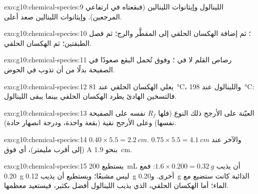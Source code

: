\begin{solution}{exo:g10:chemical-species:9}
اللينالول وإيثانوات اللينالين (فبقعتاه في ارتفاعي المرجعين). وإيثانوات
اللينالين صعد أعلى.
\end{solution}

\begin{solution}{exo:g10:chemical-species:10}
؛ ثم إضافة الهكسان الحلقي إلى المقطَّر والرج؛ ثم فصل الطبقتين؛
ثم  الهكسان الحلقي.
\end{solution}

\begin{solution}{exo:g10:chemical-species:11}
رصاص القلم لا  في ؛ وفوق  تُحمل البقع صعودًا في الصفيحة بدلًا
من أن تذوب في الحوض.
\end{solution}

\begin{solution}{exo:g10:chemical-species:12}
يغلي الهكسان الحلقي عند \qty{81}{\celsius}، واللينالول عند \qty{198}{\celsius}:
فالتسخين الهادئ يطرد الهكسان الحلقي بينما يبقى اللينالول.
\end{solution}

\begin{solution}{exo:g10:chemical-species:13}
العيّنة على الأرجح ذلك النوع (فلها $R_f$  نفسه على الصفيحة
نفسها) وعلى الأرجح نقية (بقعة واحدة، ودرجة انصهار حادة).
\end{solution}

\begin{solution}{exo:g10:chemical-species:14}
$0.40 \times 5.5 = \qty{2.2}{cm}$. والآخر عند $0.75 \times 5.5 =
\qty{4.1}{cm}$ (إلى أقرب مليمتر)، أي فوق A بنحو \qty{1.9}{cm}.
\end{solution}

\begin{solution}{exo:g10:chemical-species:15}
يستطيع \qty{200}{mL} أن يذيب $1.6 \times 0.200 = \qty{0.32}{g}$: فمع
\qty{0.20}{g} ليس مشبعًا؛ ويستطيع أن يذيب \qty{0.12}{g} أخرى.
و\qty{0.20}{g} الذائبة كانت ستضيع مع الماء؛ أما الهكسان الحلقي، الذي يذيب
اللينالول أفضل بكثير، فيستعيد معظمها.
\end{solution}

